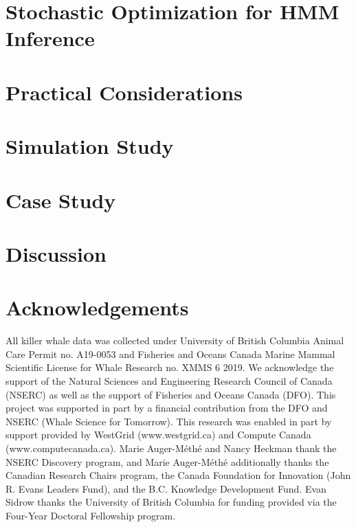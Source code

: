 \documentclass[12pt]{article}
\begin{document}
\section{Stochastic Optimization for HMM Inference}


\section{Practical Considerations}

\label{sec:prac}

\section{Simulation Study}


\section{Case Study}


\section{Discussion}


\section*{Acknowledgements}
All killer whale data was collected under University of British Columbia Animal Care Permit no. A19-0053 and Fisheries and Oceans Canada Marine Mammal Scientific License for Whale Research no. XMMS 6 2019.
We acknowledge the support of the Natural Sciences and Engineering Research Council of Canada (NSERC) as well as the support of Fisheries and Oceans Canada (DFO). This project was supported in part by a financial contribution from the DFO and NSERC (Whale Science for Tomorrow).
This research was enabled in part by support provided by WestGrid (www.westgrid.ca) and Compute Canada (www.computecanada.ca).
Marie Auger-M\'eth\'e and Nancy Heckman thank the NSERC Discovery program, and Marie Auger-M\'eth\'e additionally thanks the Canadian Research Chairs program, the Canada Foundation for Innovation (John R. Evans Leaders Fund), and the B.C. Knowledge Development Fund.
Evan Sidrow thanks the University of British Columbia for funding provided via the Four-Year Doctoral Fellowship program.

\newpage



\newpage
\begin{appendix}

\end{appendix}
\end{document}
